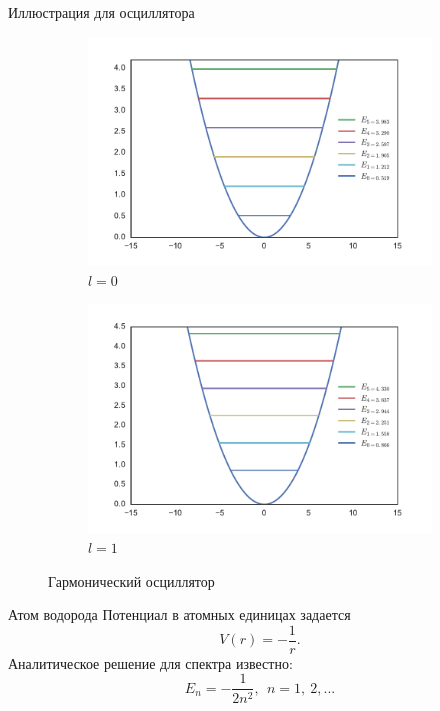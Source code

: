 \documentclass{beamer}
\begin{document}
\begin{frame}{Иллюстрация для осциллятора}
\begin{figure}[h!]
\centering
\begin{subfigure}{.5\textwidth}
  \centering
  \includegraphics[width=1.0\linewidth]{harm_osc.pdf}
  \caption{$l = 0$}
  \label{fig1:tan-sqrt}
\end{subfigure}%
\begin{subfigure}{.5\textwidth}
  \centering
  \includegraphics[width=1.0\linewidth]{harm_osc1.pdf}
  \caption{$l=1$}
  \label{fig:finite_well_sol}
\end{subfigure}
\caption{Гармонический осциллятор}
\label{fig:fin_well}
\end{figure}

\end{frame}

\begin{frame}{Атом водорода}
Потенциал в атомных единицах задается
$$V(r) = -\frac{1}{r}.$$
Аналитическое решение для спектра известно:
$$E_n = -\frac{1}{2 n^2},~~ n = 1,~2,...$$

\end{frame}
\end{document}
